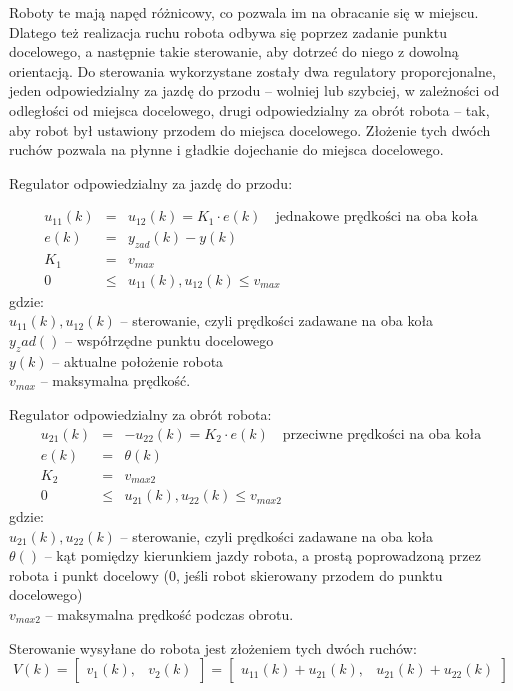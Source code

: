 \documentclass[a4paper, 12pt]{article}
\begin{document}
	Roboty te mają napęd różnicowy, co pozwala im na obracanie się w miejscu. Dlatego też realizacja ruchu robota odbywa się poprzez zadanie punktu docelowego, a następnie takie sterowanie, aby dotrzeć do niego z dowolną orientacją. Do sterowania wykorzystane zostały dwa regulatory proporcjonalne, jeden odpowiedzialny za jazdę do przodu -- wolniej lub szybciej, w zależności od odległości od miejsca docelowego, drugi odpowiedzialny za obrót robota -- tak, aby robot był ustawiony przodem do miejsca docelowego. Złożenie tych dwóch ruchów pozwala na płynne i gładkie dojechanie do miejsca docelowego.
	
	Regulator odpowiedzialny za jazdę do przodu:
	
	\begin{eqnarray}
	u_{11}(k) &=& u_{12}(k) = K_1 \cdot e(k) \quad \text{jednakowe prędkości na oba koła}\nonumber \\
	e(k) &=& y_{zad}(k) - y(k) \nonumber \\
	K_1 &=& v_{max} \nonumber \\
	0 &\leq& u_{11}(k),u_{12}(k) \leq v_{max} \nonumber
	\end{eqnarray}
	gdzie:\\
	$u_{11}(k),u_{12}(k)$ -- sterowanie, czyli prędkości zadawane na oba koła\\
	$y_zad()$ -- współrzędne punktu docelowego\\
	$y(k)$ -- aktualne położenie robota\\
	$v_{max}$ -- maksymalna prędkość.
	
	Regulator odpowiedzialny za obrót robota:
	\begin{eqnarray}
	u_{21}(k) &=& -u_{22}(k) = K_2 \cdot e(k) \quad \text{przeciwne prędkości na oba koła}\nonumber \\
	e(k) &=& \theta(k)\nonumber \\
	K_2 &=& v_{max2} \nonumber \\
	0 &\leq& u_{21}(k),u_{22}(k) \leq v_{max2} \nonumber
	\end{eqnarray}
	gdzie:\\
	$u_{21}(k),u_{22}(k)$ -- sterowanie, czyli prędkości zadawane na oba koła\\
	$\theta()$ -- kąt pomiędzy kierunkiem jazdy robota, a prostą poprowadzoną przez robota i punkt docelowy (0, jeśli robot skierowany przodem do punktu docelowego)\\
	$v_{max2}$ -- maksymalna prędkość podczas obrotu.
	
	Sterowanie wysyłane do robota jest złożeniem tych dwóch ruchów:
	\begin{displaymath}
	V(k)=\begin{bmatrix}
	v_1(k), & v_2(k)
	\end{bmatrix}=\begin{bmatrix}
	u_{11}(k)+u_{21}(k), & u_{21}(k)+u_{22}(k)
	\end{bmatrix}
	\end{displaymath}
		
\end{document}
